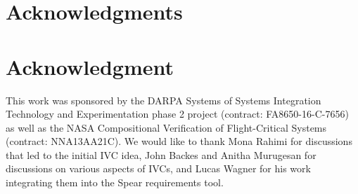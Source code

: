 \documentclass[10pt,journal,compsoc]{IEEEtran}
\begin{document}
%









%









\vspace{0.08in}




\ifCLASSOPTIONcompsoc
  \section*{Acknowledgments}
\else
  \section*{Acknowledgment}
\fi

This work was sponsored by the DARPA Systems of Systems Integration Technology and Experimentation phase 2 project (contract: FA8650-16-C-7656) as well as the NASA Compositional Verification of Flight-Critical Systems (contract: NNA13AA21C).  We would like to thank Mona Rahimi for discussions that led to the initial IVC idea, John Backes and Anitha Murugesan for discussions on various aspects of IVCs, and Lucas Wagner for his work integrating them into the Spear requirements tool.
\end{document}
